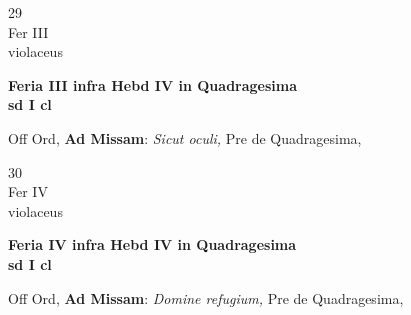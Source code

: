 \documentclass[10pt, openany]{book}
\begin{document}
        \begin{center}
            \begin{minipage}{3.5in}
                \vspace{2em}
                \begin{minipage}{0.5in}
                    {\Huge 29} \\
                    {\normalsize Fer III} \\
                    {\normalsize violaceus}
                \end{minipage}
                \begin{minipage}{3.0in}
                    \textbf{ \large Feria III infra Hebd IV in Quadragesima  \\
                    \textnormal{\normalsize sd I cl}} \\ 
                \end{minipage}
                \begin{justify}Off Ord, \textbf{Ad Missam}: \textit{Sicut oculi,} Pre de Quadragesima,  
                \end{justify}
            \end{minipage}
        \end{center}
    
        \begin{center}
            \begin{minipage}{3.5in}
                \vspace{2em}
                \begin{minipage}{0.5in}
                    {\Huge 30} \\
                    {\normalsize Fer IV} \\
                    {\normalsize violaceus}
                \end{minipage}
                \begin{minipage}{3.0in}
                    \textbf{ \large Feria IV infra Hebd IV in Quadragesima  \\
                    \textnormal{\normalsize sd I cl}} \\ 
                \end{minipage}
                \begin{justify}Off Ord, \textbf{Ad Missam}: \textit{Domine refugium,} Pre de Quadragesima,  
                \end{justify}
            \end{minipage}
        \end{center}
    
\end{document}
